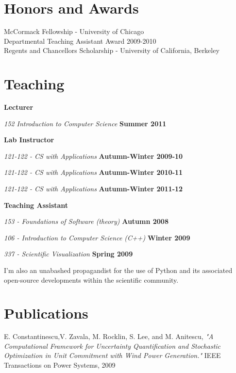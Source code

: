 \documentclass[margin,line]{res}
\newenvironment{list1}{
  \begin{list}{\ding{113}}{%
      \setlength{\itemsep}{0in}
      \setlength{\parsep}{0in} \setlength{\parskip}{0in}
      \setlength{\topsep}{0in} \setlength{\partopsep}{0in} 
      \setlength{\leftmargin}{0.17in}}}{\end{list}}
\begin{document}
\begin{resume}
\section{\sc Honors and Awards} 

McCormack Fellowship - University of Chicago\\
Departmental Teaching Assistant Award 2009-2010\\
Regents and Chancellors Scholarship - University of California, Berkeley\\

\section {\sc Teaching}

{\bf Lecturer}
\begin{list1}
\item[] {\em 152 Introduction to Computer Science} \hfill {\bf Summer 2011}
\end{list1}

{\bf Lab Instructor}
\begin{list1}
\item[] {\em 121-122 - CS with Applications}  \hfill {\bf Autumn-Winter 2009-10}
\item[] {\em 121-122 - CS with Applications}  \hfill {\bf Autumn-Winter 2010-11}
\item[] {\em 121-122 - CS with Applications}  \hfill {\bf Autumn-Winter 2011-12}
\end{list1}

{\bf Teaching Assistant}
\begin{list1}
\item[] {\em 153 - Foundations of Software (theory)} \hfill {\bf Autumn 2008}
\item[] {\em 106 - Introduction to Computer Science (C++)} \hfill {\bf Winter 2009}
\item[] {\em 337 - Scientific Visualization} \hfill {\bf Spring 2009}
\end{list1}


I'm also an unabashed propagandist for the use of Python and its associated open-source developments within the scientific community.\\

\section{\sc Publications}
E. Constantinescu,V. Zavala, M. Rocklin, S. Lee, and M. Anitescu, \textit{"A Computational Framework for Uncertainty Quantification and Stochastic Optimization in Unit Commitment with Wind Power Generation."} IEEE Transactions on Power Systems, 2009


\end{resume}
\end{document}

